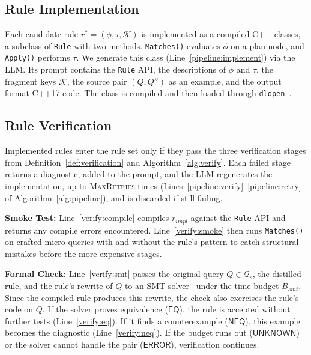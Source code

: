 

\vspace{-0.2cm}
\subsection{Rule Implementation}
\label{sec:offline:implement}
Each candidate rule $r^* = (\phi, \tau, \mathcal{K})$ is implemented as a compiled C++ classes, a subclass of \texttt{Rule} with two methods.
\texttt{Matches()} evaluates $\phi$ on a plan node, and \texttt{Apply()} performs $\tau$.
We generate this class (Line~\ref{pipeline:implement}) via the LLM.
Its prompt contains the \texttt{Rule} API, the descriptions of $\phi$ and $\tau$, the fragment keys $\mathcal{K}$, the source pair $(Q, Q'')$ as an example, and the output format C++17 code.
The class is compiled and then loaded through \texttt{dlopen}~\cite{dlopen}.

\vspace{-0.35cm}
\subsection{Rule Verification}
\label{sec:offline:verify}
Implemented rules enter the rule set only if they pass the three verification stages from Definition~\ref{def:verification} and Algorithm~\ref{alg:verify}. Each failed stage returns a diagnostic, added to the prompt, and the LLM regenerates the implementation, up to \textsc{MaxRetries} times (Lines~\ref{pipeline:verify}--\ref{pipeline:retry} of Algorithm~\ref{alg:pipeline}), and is discarded if still failing.

\textbf{Smoke Test:}
Line~\ref{verify:compile} compiles $r_{\mathit{impl}}$ against the \texttt{Rule} API and returns any compile errors encountered.
Line~\ref{verify:smoke} then runs \texttt{Matches()} on crafted micro-queries with and without the rule's pattern to catch structural mistakes before the more expensive stages.

\textbf{Formal Check:}
Line~\ref{verify:smt} passes the original query $Q \in \mathcal{Q}_s$, the distilled rule, and the rule's rewrite of $Q$ to an SMT solver~\cite{SQLSolver} under the time budget $B_{\mathit{smt}}$.
Since the compiled rule produces this rewrite, the check also exercises the rule's code on $Q$.
If the solver proves equivalence ($\mathsf{EQ}$), the rule is accepted without further tests (Line~\ref{verify:eq}).
If it finds a counterexample ($\mathsf{NEQ}$), this example becomes the diagnostic (Line~\ref{verify:neq}).
If the budget runs out ($\mathsf{UNKNOWN}$) or the solver cannot handle the pair ($\mathsf{ERROR}$), verification continues.

